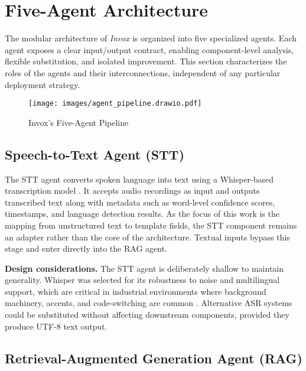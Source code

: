 \section{Five-Agent Architecture}
\label{sec:concept-architecture}

The modular architecture of \textit{Invox} is organized into five specialized agents. Each agent exposes a clear input/output contract, enabling component-level analysis, flexible substitution, and isolated improvement. This section characterizes the roles of the agents and their interconnections, independent of any particular deployment strategy.

\begin{figure}[H]
  \centering
  \texttt{[image: images/agent\_pipeline.drawio.pdf]}
  \caption{Invox’s Five-Agent Pipeline}
  \label{fig:agent-pipeline}
\end{figure}



\subsection{Speech-to-Text Agent (STT)}
\label{subsec:stt-agent}

The STT agent converts spoken language into text using a Whisper-based transcription model \cite{radford2023whisper}. It accepts audio recordings as input and outputs transcribed text along with metadata such as word-level confidence scores, timestamps, and language detection results. As the focus of this work is the mapping from unstructured text to template fields, the STT component remains an adapter rather than the core of the architecture. Textual inputs bypass this stage and enter directly into the RAG agent.

\textbf{Design considerations.} The STT agent is deliberately shallow to maintain generality. Whisper was selected for its robustness to noise and multilingual support, which are critical in industrial environments where background machinery, accents, and code-switching are common \cite{fathullah2023prompting}. Alternative ASR systems could be substituted without affecting downstream components, provided they produce UTF-8 text output.

\subsection{Retrieval-Augmented Generation Agent (RAG)}
\label{subsec:rag-agent}

